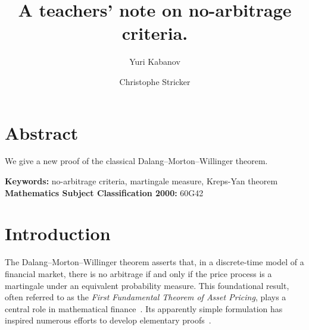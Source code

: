 \documentclass[review]{elsarticle}
\begin{document}
\begin{frontmatter}

\title{A teachers' note on no-arbitrage criteria.  %
}



\author{Yuri Kabanov  }

\author{Christophe Stricker }


\address{UMR 6623, Laboratoire de Mathématiques,}

\address{IUniversit6 de Franche-Comté.}
\address{16 Route de Gray, F-25030 Besanon Cedex, FRANCE}

\end{frontmatter}


\section*{Abstract}

\hspace{0.5cm}We give a new proof of the classical Dalang--Morton--Willinger theorem. %


\textbf{Keywords:}  no-arbitrage criteria, martingale measure, Kreps-Yan theorem\\
\textbf{Mathematics Subject Classification 2000:} 60G42


\section{Introduction}\label{sec:intro}

\medskip


\hspace{0.5cm}The Dalang--Morton--Willinger theorem asserts that, in a discrete-time model of a financial market, there is no arbitrage if and only if the price process is a martingale under an equivalent probability measure. This foundational result, often referred to as the \textit{First Fundamental Theorem of Asset Pricing}, plays a central role in mathematical finance~\cite{Shiryaev1999}. Its apparently simple formulation has inspired numerous efforts to develop elementary proofs~\cite{ Dalang1990, DelbaenPreprint, Jacod1998, Rogers1994, Kabanov1994, Schachermayer1992, Stricker1990}. 
\end{document}
